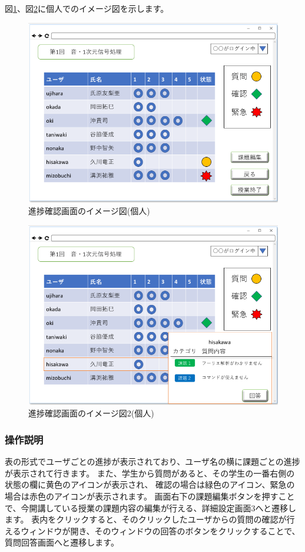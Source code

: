 図\ref{fig:22}、図\ref{fig:23}に個人でのイメージ図を示します。
\begin{figure}[htbp]
\begin{center}
  \includegraphics[width=1\linewidth,clip]{./img/22.png}
  \caption{進捗確認画面のイメージ図(個人)}\label{fig:22}
\end{center}
\end{figure}

\begin{figure}[htbp]
\begin{center}
  \includegraphics[width=1\linewidth,clip]{./img/23.png}
  \caption{進捗確認画面のイメージ図2(個人)}\label{fig:23}
\end{center}
\end{figure}
\subsubsection{操作説明}
表の形式でユーザごとの進捗が表示されており、ユーザ名の横に課題ごとの進捗が表示されて行きます。
また、学生から質問があると、その学生の一番右側の状態の欄に黄色のアイコンが表示され、
確認の場合は緑色のアイコン、緊急の場合は赤色のアイコンが表示されます。
画面右下の課題編集ボタンを押すことで、今開講している授業の課題内容の編集が行える、詳細設定画面3へと遷移します。
表内をクリックすると、そのクリックしたユーザからの質問の確認が行えるウィンドウが開き、そのウィンドウの回答のボタンをクリックすることで、
質問回答画面へと遷移します。

